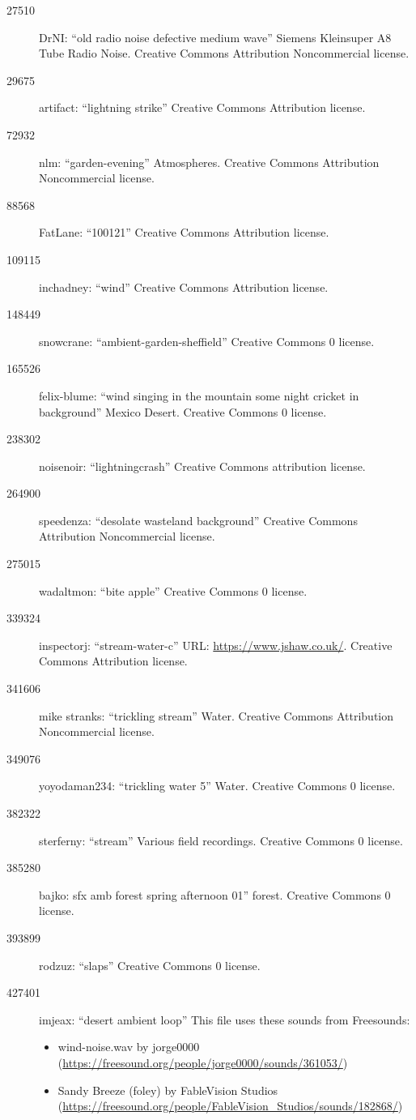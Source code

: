 \documentclass[letterpaper,twoside]{article}
\begin{document}
\begin{description}
\item[27510]DrNI: ``old radio noise defective medium wave''
  Siemens Kleinsuper A8 Tube Radio Noise.  Creative Commons
  Attribution Noncommercial license.
\item[29675]artifact: ``lightning strike''
  Creative Commons Attribution license.
\item[72932]nlm: ``garden-evening''
  Atmospheres.  Creative Commons
  Attribution Noncommercial license.
\item[88568]FatLane: ``100121''
  Creative Commons Attribution license.
\item[109115]inchadney: ``wind''
  Creative Commons Attribution license.
\item[148449]snowcrane: ``ambient-garden-sheffield''
  Creative Commons 0 license.
\item[165526]felix-blume: ``wind singing in the mountain some night
  cricket in background''
  Mexico Desert.  Creative Commons 0 license.
\item[238302]noisenoir: ``lightningcrash''
  Creative Commons attribution license.
\item[264900]speedenza: ``desolate wasteland background''
  Creative Commons Attribution Noncommercial license.
\item[275015]wadaltmon: ``bite apple''
  Creative Commons 0 license.
\item[339324]inspectorj: ``stream-water-c''
  URL: \url{https://www.jshaw.co.uk/}.
  Creative Commons Attribution license.
\item[341606]mike stranks: ``trickling stream''
  Water.  Creative Commons Attribution Noncommercial license.
\item[349076]yoyodaman234: ``trickling water 5''
  Water.  Creative Commons 0 license.
\item[382322]sterferny: ``stream''
  Various field recordings.  Creative Commons 0 license.
\item[385280]bajko: sfx amb forest spring afternoon 01''
  forest.  Creative Commons 0 license.
\item[393899]rodzuz: ``slaps''
  Creative Commons 0 license.
\item[427401]imjeax: ``desert ambient loop''
This file uses these sounds from Freesounds:
\begin{itemize}
\item wind-noise.wav by jorge0000 (\url{https://freesound.org/people/jorge0000/sounds/361053/})
\item Sandy Breeze (foley) by FableVision Studios (\url{https://freesound.org/people/FableVision_Studios/sounds/182868/})

\end{itemize}
\end{description}
\end{document}
